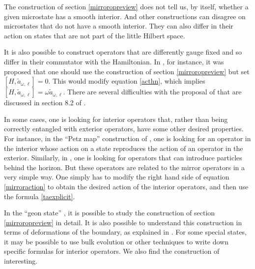\documentclass[12pt]{article}
\newcommand{\cop}[1]{#1}
\def\ta{\widetilde{\cop{a}}}
\begin{document}
The construction of section \ref{mirroropreview} does not tell us, by itself, whether a given microstate has a smooth interior. And other constructions can disagree on microstates that do not have a smooth interior.  They can also differ in their action on states that are not part of the little Hilbert space. 

It is also possible to construct operators that are differently gauge fixed and so differ in their commutator with the Hamiltonian. In \cite{Harlow:2014yoa}, for instance,  it was proposed that one should use the construction of section \ref{mirroropreview}  but set $[H, \ta_{\omega, \ell}] = 0$. This would modify equation \eqref{acthn}, which implies $[H, \ta_{\omega, \ell}] = \omega \ta_{\omega, \ell}$. There are several difficulties with the proposal of \cite{Harlow:2014yoa} that are discussed in section 8.2 of \cite{Papadodimas:2015jra}. 

In some cases, one is looking for interior operators that, rather than being correctly entangled with exterior operators, have some other desired properties.  For instance, in the ``Petz map'' construction of \cite{Penington:2019kki}, one is looking for an operator in the interior whose action on a state reproduces the action of an operator in the exterior. Similarly, in \cite{Kourkoulou:2017zaj}, one is looking for operators that can introduce particles behind the horizon. But these operators are related to the mirror operators in a very simple way. One simply has to modify the right hand side of equation \eqref{mirroraction} to obtain the desired action of the interior operators, and then use the formula \eqref{taexplicit}. 

In the ``geon state'' \cite{Guica:2014dfa}, it is possible to study the construction of section \ref{mirroropreview} in detail. It is also possible to understand this construction in terms of deformations of the boundary, as explained in \cite{deBoer:2019kyr,deBoer:2018ibj}. For some special states, it may be possible to use bulk evolution or other techniques \cite{Heemskerk:2012mn,Almheiri:2017fbd} to write down specific formulas for interior operators. We also find the construction of  \cite{Nomura:2018kia,Nomura:2019dlz,Nomura:2019qps,Nomura:2020ska}  interesting.
\end{document}
